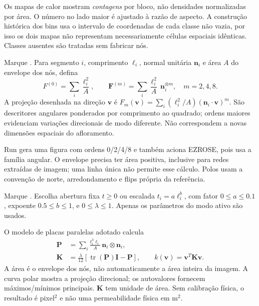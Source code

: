 Os mapas de calor mostram \emph{contagens} por bloco, não densidades normalizadas por área. O número no lado maior é ajustado à razão de aspecto. A construção histórica dos bins usa o intervalo de coordenadas de cada classe não vazia, por isso os dois mapas não representam necessariamente células espaciais idênticas. Classes ausentes são tratadas sem fabricar nós.

Marque . Para segmento \(i\), comprimento \(\ell_i\), normal unitária \(\mathbf n_i\) e área \(A\) do envelope dos nós, defina
\begin{equation}
F^{(0)}=\sum_i\frac{\ell_i^2}{A},\qquad
\mathbf F^{(m)}=\sum_i\frac{\ell_i^2}{A}\,\mathbf n_i^{\otimes m},
\quad m=2,4,8.
\end{equation}
A projeção desenhada na direção \(\mathbf v\) é
\(F_m(\mathbf v)=\sum_i(\ell_i^2/A)(\mathbf n_i\cdot\mathbf v)^m\).
São descritores angulares ponderados por comprimento ao quadrado; ordens maiores evidenciam variações direcionais de modo diferente. Não correspondem a novas dimensões espaciais do afloramento.

Run gera uma figura com ordens 0/2/4/8 e também aciona EZROSE, pois usa a família angular. O envelope precisa ter área positiva, inclusive para redes extraídas de imagem; uma linha única não permite esse cálculo. Polos usam a convenção de norte, arredondamento e flips própria da referência.

Marque . Escolha abertura fixa \(t\geq0\) ou escalada \(t_i=a\ell_i^b\), com fator \(0\leq a\leq0.1\), expoente \(0.5\leq b\leq1\), e \(0\leq\lambda\leq1\). Apenas os parâmetros do modo ativo são usados.

O modelo de placas paralelas adotado calcula
\begin{align}
\mathbf P&=\sum_i\frac{t_i^3\ell_i}{A}\,\mathbf n_i\otimes\mathbf n_i,\\
\mathbf K&=\frac{\lambda}{12}\left[\operatorname{tr}(\mathbf P)\mathbf I-\mathbf P\right],\qquad
k(\mathbf v)=\mathbf v^{\!T}\mathbf K\mathbf v.
\end{align}
A área é o envelope dos nós, não automaticamente a área inteira da imagem. A curva polar mostra a projeção direcional; os autovalores fornecem máximos/mínimos principais. \(\mathbf K\) tem unidade de área. Sem calibração física, o resultado é pixel\(^{2}\) e não uma permeabilidade física em m\(^{2}\).

